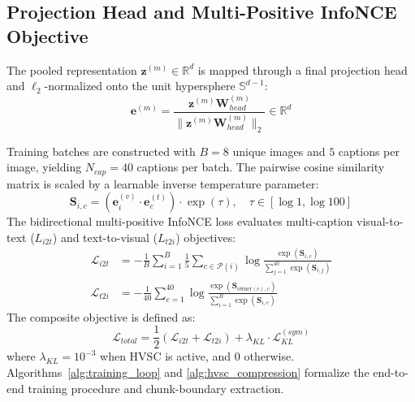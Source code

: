 \documentclass[journal]{IEEEtran}
\begin{document}
\subsection{Projection Head and Multi-Positive InfoNCE Objective}
The pooled representation $\mathbf{z}^{(m)} \in \mathbb{R}^d$ is mapped through a final projection head and $\ell_2$-normalized onto the unit hypersphere $\mathbb{S}^{d-1}$:
\begin{equation}
\mathbf{e}^{(m)} = \frac{\mathbf{z}^{(m)} \mathbf{W}_{head}^{(m)}}{\|\mathbf{z}^{(m)} \mathbf{W}_{head}^{(m)}\|_2} \in \mathbb{R}^d
\end{equation}

Training batches are constructed with $B = 8$ unique images and $5$ captions per image, yielding $N_{cap} = 40$ captions per batch. The pairwise cosine similarity matrix is scaled by a learnable inverse temperature parameter:
\begin{equation}
\mathbf{S}_{i, c} = (\mathbf{e}_i^{(v)} \cdot \mathbf{e}_c^{(t)}) \cdot \exp(\tau), \quad \tau \in [\log 1, \log 100]
\end{equation}
The bidirectional multi-positive InfoNCE loss evaluates multi-caption visual-to-text ($L_{i2t}$) and text-to-visual ($L_{t2i}$) objectives:
\begin{align}
\mathcal{L}_{i2t} &= -\frac{1}{B} \sum_{i=1}^B \frac{1}{5} \sum_{c \in \mathcal{P}(i)} \log \frac{\exp(\mathbf{S}_{i,c})}{\sum_{j=1}^{40} \exp(\mathbf{S}_{i,j})} \\
\mathcal{L}_{t2i} &= -\frac{1}{40} \sum_{c=1}^{40} \log \frac{\exp(\mathbf{S}_{\text{owner}(c), c})}{\sum_{i=1}^B \exp(\mathbf{S}_{i,c})}
\end{align}
The composite objective is defined as:
\begin{equation}
\mathcal{L}_{total} = \frac{1}{2}(\mathcal{L}_{i2t} + \mathcal{L}_{t2i}) + \lambda_{KL} \cdot \mathcal{L}_{KL}^{(sym)}
\end{equation}
where $\lambda_{KL} = 10^{-3}$ when HVSC is active, and $0$ otherwise. Algorithms~\ref{alg:training_loop} and \ref{alg:hvsc_compression} formalize the end-to-end training procedure and chunk-boundary extraction.
\end{document}
